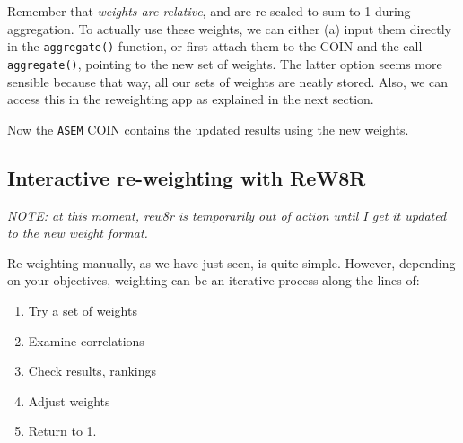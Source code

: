 \documentclass[
]{book}
\newenvironment{Shaded}{\begin{snugshade}}{\end{snugshade}}
\newcommand{\AttributeTok}[1]{\textcolor[rgb]{0.77,0.63,0.00}{#1}}
\newcommand{\CommentTok}[1]{\textcolor[rgb]{0.56,0.35,0.01}{\textit{#1}}}
\newcommand{\FunctionTok}[1]{\textcolor[rgb]{0.00,0.00,0.00}{#1}}
\newcommand{\NormalTok}[1]{#1}
\newcommand{\OtherTok}[1]{\textcolor[rgb]{0.56,0.35,0.01}{#1}}
\newcommand{\SpecialCharTok}[1]{\textcolor[rgb]{0.00,0.00,0.00}{#1}}
\newcommand{\StringTok}[1]{\textcolor[rgb]{0.31,0.60,0.02}{#1}}
\providecommand{\tightlist}{%
  \setlength{\itemsep}{0pt}\setlength{\parskip}{0pt}}
\begin{document}
Remember that \emph{weights are relative}, and are re-scaled to sum to 1 during aggregation. To actually use these weights, we can either (a) input them directly in the \texttt{aggregate()} function, or first attach them to the COIN and the call \texttt{aggregate()}, pointing to the new set of weights. The latter option seems more sensible because that way, all our sets of weights are neatly stored. Also, we can access this in the reweighting app as explained in the next section.

\begin{Shaded}
\end{Shaded}

Now the \texttt{ASEM} COIN contains the updated results using the new weights.

\hypertarget{interactive-re-weighting-with-rew8r}{%
\subsection{Interactive re-weighting with ReW8R}\label{interactive-re-weighting-with-rew8r}}

\emph{NOTE: at this moment, rew8r is temporarily out of action until I get it updated to the new weight format.}

Re-weighting manually, as we have just seen, is quite simple. However, depending on your objectives, weighting can be an iterative process along the lines of:

\begin{enumerate}
\def\labelenumi{\arabic{enumi}.}
\tightlist
\item
  Try a set of weights
\item
  Examine correlations
\item
  Check results, rankings
\item
  Adjust weights
\item
  Return to 1.
\end{enumerate}
\end{document}

